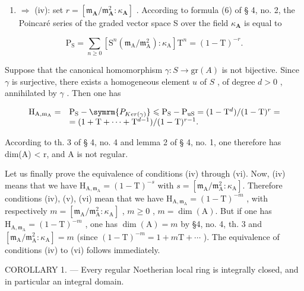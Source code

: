 \begin{enumerate}
\def\labelenumi{(\roman{enumi})}
\tightlist
\item
  \(\Rightarrow\) (iv): set \(r = [\mathfrak{m}_{\mathbf{A}} / \mathfrak{m}_{\mathbf{A}}^{2}:\kappa_{\mathbf{A}}]\) . According to formula (6) of § 4, no. 2, the Poincaré series of the graded vector space S over the field \(\kappa_{\mathbf{A}}\) is equal to
\end{enumerate}

\[
\mathrm{P} _ {\mathrm{S}} = \sum_ {n \geqslant 0} \left[ \mathrm{S} ^ {n} (\mathfrak {m} _ {\mathrm{A}} / \mathfrak {m} _ {\mathrm{A}} ^ {2}): \kappa_ {\mathrm{A}} \right] \mathrm{T} ^ {n} = (1 - \mathrm{T}) ^ {- r}.
\]

Suppose that the canonical homomorphism \(\gamma: S \to \mathrm{gr}(A)\) is not bijective. Since \(\gamma\) is surjective, there exists a homogeneous element \(u\) of \(S\) , of degree \(d > 0\) , annihilated by \(\gamma\) . Then one has

\[
\begin{array}{r l} \mathrm {H_ {A,m_ {A}}} = & \mathrm {P_ {S}} - \symrm {P_ {Ker(\gamma)}} \leqslant \mathrm {P_ {S}} - \mathrm {P_ {uS}} = (1 - \mathrm{T} ^ {d}) / (1 - \mathrm{T}) ^ {r} = \\ & = (1 + \mathrm{T} + \dots + \mathrm{T} ^ {d - 1}) / (1 - \mathrm{T}) ^ {r - 1}. \end{array}
\]

According to th. 3 of § 4, no. 4 and lemma 2 of § 4, no. 1, one therefore has dim(A) \textless{} r, and A is not regular.

Let us finally prove the equivalence of conditions (iv) through (vi). Now, (iv) means that we have \(\mathrm{H}_{\mathrm{A},\mathfrak{m}_{\mathrm{A}}}=(1-\mathrm{T})^{-s}\) with \(s=[\mathfrak{m}_{\mathrm{A}}/\mathfrak{m}_{\mathrm{A}}^{2}:\kappa_{\mathrm{A}}]\). Therefore conditions (iv), (v), (vi) mean that we have \(\mathrm{H}_{\mathrm{A},\mathfrak{m}_{\mathrm{A}}}=(1-\mathrm{T})^{-m}\) , with respectively \(m=[\mathfrak{m}_{\mathrm{A}}/\mathfrak{m}_{\mathrm{A}}^{2}:\kappa_{\mathrm{A}}]\) , \(m\geqslant0\) , \(m=\dim(\mathrm{A})\). But if one has \(\mathrm{H}_{\mathrm{A},\mathfrak{m}_{\mathrm{A}}}=(1-\mathrm{T})^{-m}\) , one has \(\dim(\mathrm{A})=m\) by §4, no. 4, th. 3 and \([\mathfrak{m}_{\mathrm{A}}/\mathfrak{m}_{\mathrm{A}}^{2}:\kappa_{\mathrm{A}}]=m\) (since \((1-\mathrm{T})^{-m}=1+m\mathrm{T}+\cdots\) ). The equivalence of conditions (iv) to (vi) follows immediately.

COROLLARY 1. --- Every regular Noetherian local ring is integrally closed, and in particular an integral domain.

